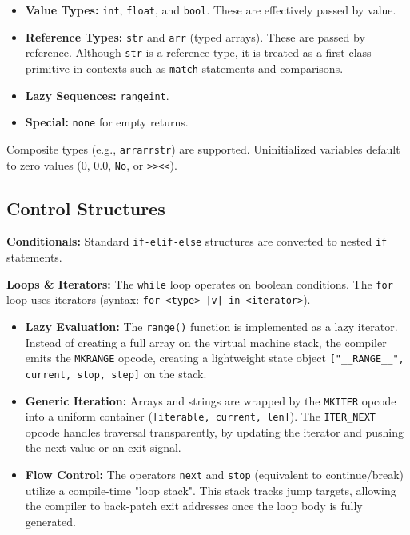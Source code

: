 \documentclass[11pt,a4paper]{article}
\begin{document}
\begin{itemize}
    \item \textbf{Value Types:} \texttt{int}, \texttt{float}, and \texttt{bool}. These are effectively passed by value.
    \item \textbf{Reference Types:} \texttt{str} and \texttt{arr} (typed arrays). These are passed by reference. Although \texttt{str} is a reference type, it is treated as a first-class primitive in contexts such as \texttt{match} statements and comparisons.
    \item \textbf{Lazy Sequences:} \texttt{range\textquotesingle int}.
    \item \textbf{Special:} \texttt{none} for empty returns.
\end{itemize}
Composite types (e.g., \texttt{arr\textquotesingle arr\textquotesingle str}) are supported.
Uninitialized variables default to zero values (0, 0.0, \texttt{No}, or \texttt{>><<}).

\subsection{Control Structures}
\textbf{Conditionals:} Standard \texttt{if-elif-else} structures are converted to nested \texttt{if} statements.

\textbf{Loops \& Iterators:} The \texttt{while} loop operates on boolean conditions.
The \texttt{for} loop uses iterators (syntax: \texttt{for <type> |v| in <iterator>}).

\begin{itemize}
    \item \textbf{Lazy Evaluation:} The \texttt{range()} function is implemented as a lazy iterator. Instead of creating a full array on the virtual machine stack, the compiler emits the \texttt{MKRANGE} opcode, creating a lightweight state object \texttt{["\_\_RANGE\_\_", current, stop, step]} on the stack.
    \item \textbf{Generic Iteration:} Arrays and strings are wrapped by the \texttt{MKITER} opcode into a uniform container (\texttt{[iterable, current, len]}).
    The \texttt{ITER\_NEXT} opcode handles traversal transparently, by updating the iterator and pushing the next value or an exit signal.
    \item \textbf{Flow Control:} The operators \texttt{next} and \texttt{stop} (equivalent to continue/break) utilize a compile-time "loop stack".
    This stack tracks jump targets, allowing the compiler to back-patch exit addresses once the loop body is fully generated.
\end{itemize}
\end{document}
